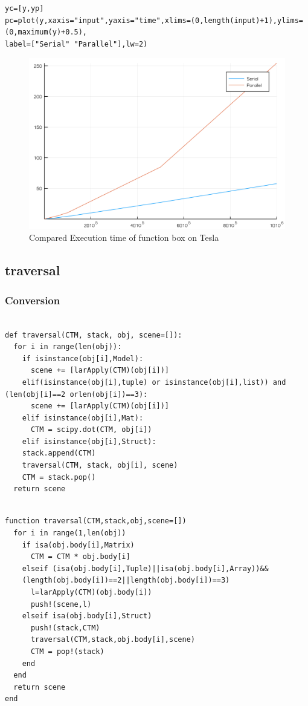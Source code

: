 \documentclass[a4paper,12pt]{article}
\begin{document}
\noindent {}
\begin{Verbatim}[fontsize=\footnotesize]
yc=[y,yp]
pc=plot(y,xaxis="input",yaxis="time",xlims=(0,length(input)+1),ylims=(0,maximum(y)+0.5),
label=["Serial" "Parallel"],lw=2)
\end{Verbatim}
\begin{figure}[!h]
\centering
\includegraphics[scale=0.08]{compbox.png}
\caption{Compared Execution time of function box on Tesla}
\end{figure}

\newpage

\subsection{traversal}
\subsubsection{Conversion}
\begin{Verbatim}[fontsize=\footnotesize]

def traversal(CTM, stack, obj, scene=[]):
  for i in range(len(obj)):
    if isinstance(obj[i],Model):
      scene += [larApply(CTM)(obj[i])]
    elif(isinstance(obj[i],tuple) or isinstance(obj[i],list)) and (len(obj[i]==2 orlen(obj[i])==3):
      scene += [larApply(CTM)(obj[i])]
    elif isinstance(obj[i],Mat): 
      CTM = scipy.dot(CTM, obj[i])
    elif isinstance(obj[i],Struct):
	stack.append(CTM)
	traversal(CTM, stack, obj[i], scene)
	CTM = stack.pop()
  return scene
\end{Verbatim}
\begin{Verbatim}[fontsize=\footnotesize]

function traversal(CTM,stack,obj,scene=[])
  for i in range(1,len(obj))
    if isa(obj.body[i],Matrix)
      CTM = CTM * obj.body[i]
    elseif (isa(obj.body[i],Tuple)||isa(obj.body[i],Array))&&
    (length(obj.body[i])==2||length(obj.body[i])==3)
      l=larApply(CTM)(obj.body[i])
      push!(scene,l)
    elseif isa(obj.body[i],Struct)
      push!(stack,CTM)
      traversal(CTM,stack,obj.body[i],scene)
      CTM = pop!(stack)
    end
  end
  return scene
end

\end{Verbatim}
\end{document}
